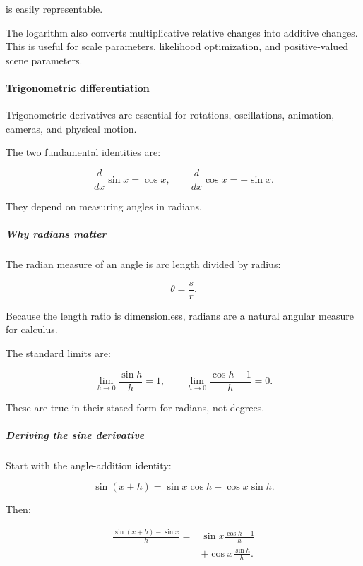 is easily representable.

The logarithm also converts multiplicative relative changes into additive changes. This is useful for scale parameters, likelihood optimization, and positive-valued scene parameters.

\paragraph{Trigonometric differentiation}\label{01-foundations-i-ch020-trigonometric-differentiation}

\hypertarget{01-foundations-i-ch020-trigonometric-differentiation}{}

Trigonometric derivatives are essential for rotations, oscillations, animation, cameras, and physical motion.

The two fundamental identities are:

\[
\boxed{\frac d{dx}\sin x=\cos x}, \qquad \boxed{\frac d{dx}\cos x=-\sin x}.
\]

They depend on measuring angles in radians.

\subparagraph{Why radians matter}\label{01-foundations-i-ch020-why-radians-matter}

\hypertarget{01-foundations-i-ch020-why-radians-matter}{}

The radian measure of an angle is arc length divided by radius:

\[
\theta=\frac{s}{r}.
\]

Because the length ratio is dimensionless, radians are a natural angular measure for calculus.

The standard limits are:

\[
\lim_{h\to0}\frac{\sin h}{h}=1, \qquad \lim_{h\to0}\frac{\cos h-1}{h}=0.
\]

These are true in their stated form for radians, not degrees.

\subparagraph{Deriving the sine derivative}\label{01-foundations-i-ch020-deriving-the-sine-derivative}

\hypertarget{01-foundations-i-ch020-deriving-the-sine-derivative}{}

Start with the angle-addition identity:

\[
\sin(x+h)=\sin x\cos h+\cos x\sin h.
\]

Then:

\[
\begin{aligned} \frac{\sin(x+h)-\sin x}{h} =&\sin x\frac{\cos h-1}{h}\\ &+\cos x\frac{\sin h}{h}. \end{aligned}
\]

